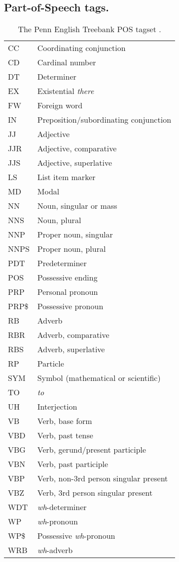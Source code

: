 
\subsection{Part-of-Speech tags.}
%
\begin{table}[htbp]
	\tiny
	\caption[The Penn English Treebank POS tagset]{The Penn English Treebank POS tagset \parencite{Marcus.1993}.}
	\label{tab:POS_tags}
	\centering
	\begin{tabular}{ll}
		\toprule
		CC& Coordinating conjunction \\
		CD& Cardinal number\\
		DT& Determiner\\
		EX& Existential \textit{there}\\
		FW& Foreign word\\
		IN& Preposition/subordinating conjunction\\
		JJ& Adjective\\
		JJR& Adjective, comparative\\
		JJS& Adjective, superlative\\
		LS& List item marker\\
		MD& Modal\\
		NN& Noun, singular or mass\\
		NNS& Noun, plural\\
		NNP& Proper noun, singular\\
		NNPS& Proper noun, plural\\
		PDT& Predeterminer\\
		POS& Possessive ending\\
		PRP& Personal pronoun\\
		PRP\$& Possessive pronoun\\
		RB& Adverb\\
		RBR& Adverb, comparative\\
		RBS& Adverb, superlative\\
		RP& Particle\\
		SYM& Symbol (mathematical or scientific)\\
		TO& \textit{to}\\
		UH& Interjection\\
		VB& Verb, base form\\
		VBD& Verb, past tense\\
		VBG& Verb, gerund/present participle\\
		VBN& Verb, past participle\\
		VBP& Verb, non-3rd person singular present \\
		VBZ& Verb, 3rd person singular present\\
		WDT& \textit{wh}-determiner\\
		WP& \textit{wh}-pronoun\\
		WP\$& Possessive \textit{wh}-pronoun\\
		WRB& \textit{wh}-adverb\\
		\bottomrule
	\end{tabular}
\end{table}
